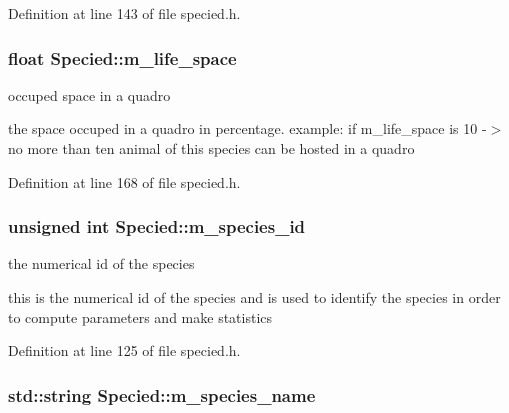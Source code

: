 Definition at line 143 of file specied.h.

\hypertarget{classSpecied_a97ee13a155f2b2a58fed03279a2faa09}{
\subsubsection[{m\_\-life\_\-space}]{\setlength{\rightskip}{0pt plus 5cm}float {\bf Specied::m\_\-life\_\-space}}}
\label{classSpecied_a97ee13a155f2b2a58fed03279a2faa09}


occuped space in a quadro 

the space occuped in a quadro in percentage. example: if m\_\-life\_\-space is 10 -\/$>$ no more than ten animal of this species can be hosted in a quadro 

Definition at line 168 of file specied.h.

\hypertarget{classSpecied_a7ddb2bbcdf287f07894da310b0a37dd0}{
\subsubsection[{m\_\-species\_\-id}]{\setlength{\rightskip}{0pt plus 5cm}unsigned int {\bf Specied::m\_\-species\_\-id}}}
\label{classSpecied_a7ddb2bbcdf287f07894da310b0a37dd0}


the numerical id of the species 

this is the numerical id of the species and is used to identify the species in order to compute parameters and make statistics 

Definition at line 125 of file specied.h.

\hypertarget{classSpecied_a028ecdb54e6a4f37406d3abcccf0de1c}{
\subsubsection[{m\_\-species\_\-name}]{\setlength{\rightskip}{0pt plus 5cm}std::string {\bf Specied::m\_\-species\_\-name}}}
\label{classSpecied_a028ecdb54e6a4f37406d3abcccf0de1c}


